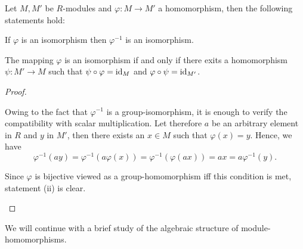 \begin{lem}
Let $M,M'$ be $R$-modules and $\varphi\colon M\rightarrow M'$ a homomorphism, then the following statements hold:
\begin{thmlist}
\item If $\varphi$ is an isomorphism then $\varphi^{-1}$ is an isomorphism.
\item The mapping $\varphi$ is an isomorphism if and only if there exits a homomorphism $\psi\colon M'\rightarrow M$ such that $\psi\circ\varphi=\operatorname{id}_M$ and $\varphi\circ\psi=\operatorname{id}_{M'}$.
\end{thmlist}
\end{lem}
\begin{proof}
\begin{plist}
\item Owing to the fact that $\varphi^{-1}$ is a group-isomorphism, it is enough to verify the compatibility with scalar multiplication. Let therefore $a$ be an arbitrary element in $R$ and $y$ in $M'$, then there exists an $x\in M$ such that $\varphi(x)=y$. Hence, we have
\begin{equation*}
\varphi^{-1}(ay)=\varphi^{-1}(a\varphi(x))=\varphi^{-1}(\varphi(ax))=ax=a\varphi^{-1}(y).
\end{equation*}
\item Since $\varphi$ is bijective viewed as a group-homomorphism iff this condition is met, statement (ii) is clear.
\end{plist}
\end{proof}

We will continue with a brief study of the algebraic structure of module-homomorphisms.

